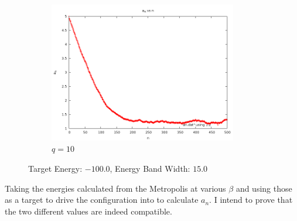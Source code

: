 \documentclass[12pt,a4paper,notitlepage,twoside]{article}
\begin{document}
\begin{figure}[H]
\begin{subfigure}[b]{0.45\textwidth}
	\includegraphics[width=0.9\textwidth]{q10d20/anconvergence.png}
	\caption{$q=10$}
\end{subfigure}
\caption{Target Energy: $-100.0$, Energy Band Width: $15.0$}
\end{figure}

Taking the energies calculated from the Metropolis at various $\beta$ and using those as a target to drive the configuration into to calculate $a_n$. I intend to prove that the two different values are indeed compatible.
\end{document}
